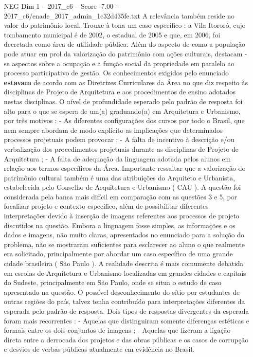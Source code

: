 \begin{textsample}{NEG Dim 1 – 2017\_c6 – Score -7.00 – 2017\_c6/enade\_2017\_admin\_1e32d435fe.txt}
A relevância também reside no valor do patrimônio local.
Trouxe à tona um caso específico : a Vila Itororó, cujo tombamento municipal é de 2002, o estadual de 2005 e que, em 2006, foi decretada como área de utilidade pública.
Além do aspecto de como a população pode atuar em prol da valorização do patrimônio com ações culturais, destacam -se aspectos sobre a ocupação e a função social da propriedade em paralelo ao processo participativo de gestão.
Os conhecimentos exigidos pelo enunciado \textbf{estavam} de acordo com as Diretrizes Curriculares da Área no que diz respeito às disciplinas de Projeto de Arquitetura e aos procedimentos de ensino adotados nestas disciplinas.
O nível de profundidade esperado pelo padrão de resposta foi alto para o que se espera de um(a) graduando(a) em Arquitetura e Urbanismo, por três motivos : - As diferentes configurações dos cursos por todo o Brasil, que nem sempre abordam de modo explícito as implicações que determinados processos projetuais podem provocar ; - A falta de incentivo à descrição e/ou verbalização dos procedimentos projetuais durante as disciplinas de Projeto de Arquitetura ; - A falta de adequação da linguagem adotada pelos alunos em relação aos termos específicos da Área.
Importante ressaltar que a valorização do patrimônio cultural também é uma das atribuições do Arquiteto e Urbanista, estabelecida pelo Conselho de Arquitetura e Urbanismo ( CAU ).
A questão foi considerada pela banca mais difícil em comparação com as questões 3 e 5, por focalizar projeto e contexto específico, além de possibilitar diferentes interpretações devido à inserção de imagens referentes aos processos de projeto discutidos na questão.
Embora a linguagem fosse simples, as informações e os dados e imagens, não muito claras, apresentados no enunciado para a solução do problema, não se mostraram suficientes para esclarecer ao aluno o que realmente era solicitado, principalmente por abordar um caso específico de uma grande cidade brasileira ( São Paulo ).
A realidade descrita é mais comumente debatida em escolas de Arquitetura e Urbanismo localizadas em grandes cidades e capitais do Sudeste, principalmente em São Paulo, onde se situa o estudo de caso apresentado na questão.
O possível desconhecimento do sítio por estudantes de outras regiões do país, talvez tenha contribuído para interpretações diferentes da esperada pelo padrão de resposta.
Dois tipos de respostas divergentes da esperada foram mais recorrentes : - Aquelas que distinguiram somente diferenças estéticas e formais entre os dois conjuntos de imagens ; - Aquelas que fizeram a ligação direta entre a derrocada dos projetos e das obras públicas e os casos de corrupção e desvios de verbas públicas atualmente em evidência no Brasil.

\end{textsample}
